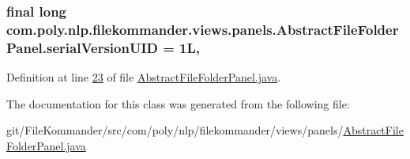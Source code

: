 \hypertarget{classcom_1_1poly_1_1nlp_1_1filekommander_1_1views_1_1panels_1_1_abstract_file_folder_panel_ae889f90306f23cb850c4f6279309bb46}{
\subsubsection[{serial\-Version\-U\-I\-D}]{\setlength{\rightskip}{0pt plus 5cm}final long com.\-poly.\-nlp.\-filekommander.\-views.\-panels.\-Abstract\-File\-Folder\-Panel.\-serial\-Version\-U\-I\-D = 1\-L\hspace{0.3cm}{\ttfamily [static]}, {\ttfamily [private]}}}\label{classcom_1_1poly_1_1nlp_1_1filekommander_1_1views_1_1panels_1_1_abstract_file_folder_panel_ae889f90306f23cb850c4f6279309bb46}


Definition at line \hyperlink{L23}{23} of file \hyperlink{}{Abstract\-File\-Folder\-Panel.\-java}.



The documentation for this class was generated from the following file\-:\begin{DoxyCompactItemize}
\item 
git/\-File\-Kommander/src/com/poly/nlp/filekommander/views/panels/\hyperlink{_abstract_file_folder_panel_8java}{Abstract\-File\-Folder\-Panel.\-java}\end{DoxyCompactItemize}
